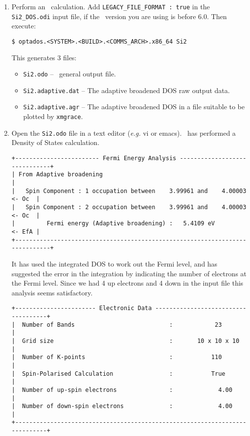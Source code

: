 \documentclass[a4paper,11pt,twoside]{book}
\begin{document}
{\begin{enumerate}
  \verb#$ castep Si2#

This should take a couple of seconds to run. More help can be found in  the tutorials  on  the \castep\ website \verb#www.castep.org#.

\item Perform an \optados\ calculation.  Add \verb#LEGACY_FILE_FORMAT : true# in the \verb#Si2_DOS.odi# input file, if the \castep\ version you are using is before 6.0. Then execute:

\verb#$ optados.<SYSTEM>.<BUILD>.<COMMS_ARCH>.x86_64 Si2#

This generates 3 files:
\begin{itemize}
\item \verb#Si2.odo# -- \optados\ general output file.
\item \verb#Si2.adaptive.dat# -- The adaptive broadened DOS raw output data.
\item  \verb#Si2.adaptive.agr# -- The adaptive broadened DOS in a file suitable to be plotted by  \verb#xmgrace#.
\end{itemize}

\item Open the \verb#Si2.odo# file in a text editor (\emph{e.g.} vi or emacs).  \optados\ has performed a Density of States calculation.

\begin{verbatim}
+------------------------ Fermi Energy Analysis ------------------------------+
| From Adaptive broadening                                                    |
|   Spin Component : 1 occupation between    3.99961 and    4.00003    <- Oc  |
|   Spin Component : 2 occupation between    3.99961 and    4.00003    <- Oc  |
|         Fermi energy (Adaptive broadening) :   5.4109 eV             <- EfA |
+-----------------------------------------------------------------------------+
\end{verbatim}
It has used the integrated DOS to work out the Fermi level, and has suggested the error in the integration by indicating the number of electrons at the Fermi level. Since we had 4 up electrons and 4 down in the input file this analysis seems satisfactory.
\begin{verbatim}
+----------------------- Electronic Data ------------------------------------+
|  Number of Bands                           :            23                 |
|  Grid size                                 :       10 x 10 x 10            |
|  Number of K-points                        :           110                 |
|  Spin-Polarised Calculation                :           True                |
|  Number of up-spin electrons               :             4.00              |
|  Number of down-spin electrons             :             4.00              |
+----------------------------------------------------------------------------+
\end{verbatim}


\end{enumerate}}
\end{document}
